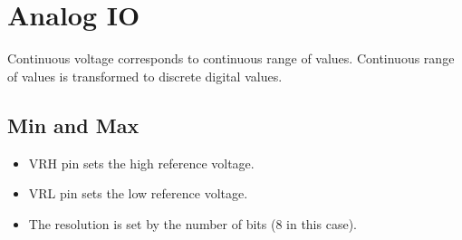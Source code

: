 \section{Analog IO}
	Continuous voltage corresponds to continuous range of values.
	Continuous range of values is transformed to discrete digital values.
	
	\subsection{Min and Max}
		\begin{itemize}
			\item VRH pin sets the high reference voltage.
			\item VRL pin sets the low reference voltage.
			\item The resolution is set by the number of bits (8 in this case).
		\end{itemize}
